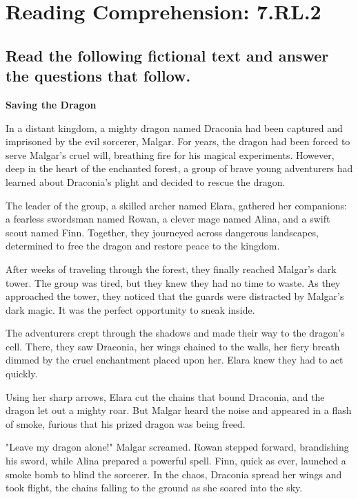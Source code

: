 \documentclass[12pt]{article}
\begin{document}
\onehalfspacing

\section*{Reading Comprehension: 7.RL.2}

\subsection*{Read the following fictional text and answer the questions that follow.}

\begin{flushleft}
\textbf{Saving the Dragon}
\end{flushleft}

In a distant kingdom, a mighty dragon named Draconia had been captured and imprisoned by the evil sorcerer, Malgar. For years, the dragon had been forced to serve Malgar's cruel will, breathing fire for his magical experiments. However, deep in the heart of the enchanted forest, a group of brave young adventurers had learned about Draconia’s plight and decided to rescue the dragon.

The leader of the group, a skilled archer named Elara, gathered her companions: a fearless swordsman named Rowan, a clever mage named Alina, and a swift scout named Finn. Together, they journeyed across dangerous landscapes, determined to free the dragon and restore peace to the kingdom.

After weeks of traveling through the forest, they finally reached Malgar’s dark tower. The group was tired, but they knew they had no time to waste. As they approached the tower, they noticed that the guards were distracted by Malgar’s dark magic. It was the perfect opportunity to sneak inside.

The adventurers crept through the shadows and made their way to the dragon's cell. There, they saw Draconia, her wings chained to the walls, her fiery breath dimmed by the cruel enchantment placed upon her. Elara knew they had to act quickly.

Using her sharp arrows, Elara cut the chains that bound Draconia, and the dragon let out a mighty roar. But Malgar heard the noise and appeared in a flash of smoke, furious that his prized dragon was being freed.

"Leave my dragon alone!" Malgar screamed. Rowan stepped forward, brandishing his sword, while Alina prepared a powerful spell. Finn, quick as ever, launched a smoke bomb to blind the sorcerer. In the chaos, Draconia spread her wings and took flight, the chains falling to the ground as she soared into the sky.
\end{document}

